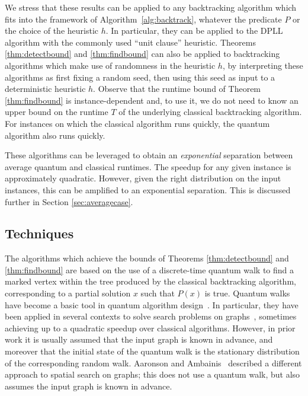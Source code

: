 \documentclass[11pt]{article}
\begin{document}
We stress that these results can be applied to any backtracking algorithm which fits into the framework of Algorithm~\ref{alg:backtrack}, whatever the predicate $P$ or the choice of the heuristic $h$. In particular, they can be applied to the DPLL algorithm with the commonly used ``unit clause'' heuristic. Theorems \ref{thm:detectbound} and \ref{thm:findbound} can also be applied to backtracking algorithms which make use of randomness in the heuristic $h$, by interpreting these algorithms as first fixing a random seed, then using this seed as input to a deterministic heuristic $h$. Observe that the runtime bound of Theorem \ref{thm:findbound} is instance-dependent and, to use it, we do not need to know an upper bound on the runtime $T$ of the underlying classical backtracking algorithm. For instances on which the classical algorithm runs quickly, the quantum algorithm also runs quickly.

These algorithms can be leveraged to obtain an {\em exponential} separation between average quantum and classical runtimes. The speedup for any given instance is approximately quadratic. However, given the right distribution on the input instances, this can be amplified to an exponential separation. This is discussed further in Section \ref{sec:averagecase}.


\subsection{Techniques}

The algorithms which achieve the bounds of Theorems \ref{thm:detectbound} and \ref{thm:findbound} are based on the use of a discrete-time quantum walk to find a marked vertex within the tree produced by the classical backtracking algorithm, corresponding to a partial solution $x$ such that $P(x)$ is true. Quantum walks have become a basic tool in quantum algorithm design~\cite{childs03,ambainis04,szegedy04,magniez11}. In particular, they have been applied in several contexts to solve search problems on graphs~\cite{shenvi03,szegedy04,magniez11,krovi15}, sometimes achieving up to a quadratic speedup over classical algorithms. However, in prior work it is usually assumed that the input graph is known in advance, and moreover that the initial state of the quantum walk is the stationary distribution of the corresponding random walk. Aaronson and Ambainis~\cite{aaronson05} described a different approach to spatial search on graphs; this does not use a quantum walk, but also assumes the input graph is known in advance.
\end{document}
